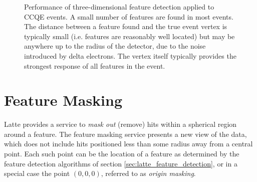 \begin{figure}
\centering
{}
\caption[Performance of the feature detection service in 3D]{\label{fig:feature_3d}Performance of three-dimensional feature detection applied to \acs{CCQE} events.  A small number of features are found in most events.  The distance between a feature found and the true event vertex is typically small (i.e. features are reasonably well located) but may be anywhere up to the radius of the detector, due to the noise introduced by delta electrons.  The vertex itself typically provides the strongest response of all features in the event.}
\end{figure}

\section{Feature Masking}
Latte provides a service to \emph{mask out} (remove) hits within a spherical region around a feature. The feature masking service presents a new view of the data, which does not include hits positioned less than some radius away from a central point. Each such point can be the location of a feature as determined by the feature detection algorithms of section \ref{sec:latte_feature_detection}, or in a special case the point $(0,0,0)$, referred to as \emph{origin masking}. 

